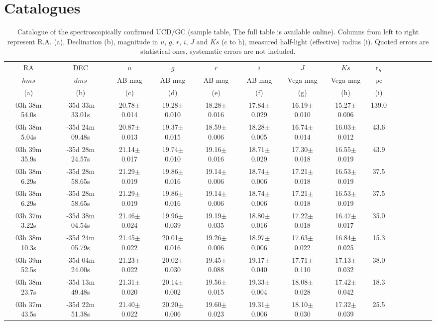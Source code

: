 \documentclass[fleqn,usenatbib]{mnras}
\begin{document}

%
\section{Catalogues}
\begin{table*}
\caption {Catalogue of the spectroscopically confirmed UCD/GC (sample table, The full table is available online). Columns from left to right represent R.A. (a), Declination (b), magnitude in $u$, $g$, $r$, $i$, $J$ and $Ks$ (c to h), measured half-light (effective) radius (i). Quoted errors are statistical ones, systematic errors are not included. }
\begin{tabular}{ ccccccccccccccc } \hline  
RA & DEC & $u$ & $g$ & $r$ & $i$ & $J$ & $Ks$ & r$_h$ \\
$hms$ & $dms$ & AB mag & AB mag & AB mag & AB mag & Vega mag & Vega mag & pc \\
(a) & (b) &  (c) &  (d) &  (e) &  (f) &  (g)  &  (h) & (i) \\
\hline
03h 38m 54.0s & -35d 33m 33.01s & 20.78$\pm$0.014 & 19.28$\pm$0.010 & 18.28$\pm$0.016 & 17.84$\pm$0.029 & 16.19$\pm$0.010 & 15.27$\pm$0.006 & 139.0 \\
03h 38m 5.04s & -35d 24m 09.48s & 20.87$\pm$0.013 & 19.37$\pm$0.015 & 18.59$\pm$0.006 & 18.28$\pm$0.005 & 16.74$\pm$0.014 & 16.03$\pm$0.012 & 43.6 \\
03h 39m 35.9s & -35d 28m 24.57s & 21.14$\pm$0.017 & 19.74$\pm$0.010 & 19.16$\pm$0.016 & 18.71$\pm$0.029 & 17.30$\pm$0.018 & 16.55$\pm$0.019 & 43.9 \\
03h 38m 6.29s & -35d 28m 58.65s & 21.29$\pm$0.019 & 19.86$\pm$0.016 & 19.14$\pm$0.006 & 18.74$\pm$0.006 & 17.21$\pm$0.018 & 16.53$\pm$0.019 & 37.5 \\
03h 38m 6.29s & -35d 28m 58.65s & 21.29$\pm$0.019 & 19.86$\pm$0.016 & 19.14$\pm$0.006 & 18.74$\pm$0.006 & 17.21$\pm$0.018 & 16.53$\pm$0.019 & 37.5 \\
03h 37m 3.22s & -35d 38m 04.54s & 21.46$\pm$0.024 & 19.96$\pm$0.039 & 19.19$\pm$0.035 & 18.80$\pm$0.016 & 17.22$\pm$0.018 & 16.47$\pm$0.017 & 35.0 \\
03h 38m 10.3s & -35d 24m 05.79s & 21.45$\pm$0.022 & 20.01$\pm$0.016 & 19.26$\pm$0.006 & 18.97$\pm$0.006 & 17.63$\pm$0.022 & 16.84$\pm$0.025 & 15.3 \\
03h 39m 52.5s & -35d 04m 24.00s & 21.23$\pm$0.022 & 20.02$\pm$0.030 & 19.45$\pm$0.088 & 19.17$\pm$0.040 & 17.71$\pm$0.110 & 17.13$\pm$0.032 & 38.0 \\
03h 38m 23.7s & -35d 13m 49.48s & 21.31$\pm$0.020 & 20.14$\pm$0.002 & 19.56$\pm$0.015 & 19.33$\pm$0.004 & 18.08$\pm$0.028 & 17.42$\pm$0.042 & 18.3 \\
03h 37m 43.5s & -35d 22m 51.38s & 21.40$\pm$0.022 & 20.20$\pm$0.006 & 19.60$\pm$0.023 & 19.31$\pm$0.006 & 18.10$\pm$0.030 & 17.32$\pm$0.039 & 25.5 \\


\end{tabular}
\end{table*}
\end{document}
